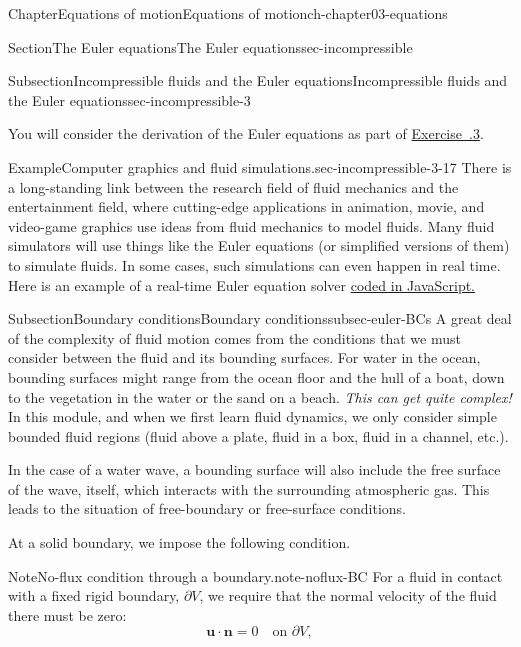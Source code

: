 \documentclass[oneside,10pt,]{book}
\newcommand{\xreffont}{\relax}
\numberwithin{equation}{section}
\newcommand{\bn}{\boldsymbol{n}}
\newcommand{\bu}{\boldsymbol{u}}
\begin{document}
\begin{chapterptx}{Chapter}{Equations of motion}{}{Equations of motion}{}{}{ch-chapter03-equations}
\begin{sectionptx}{Section}{The Euler equations}{}{The Euler equations}{}{}{sec-incompressible}
\begin{subsectionptx}{Subsection}{Incompressible fluids and the Euler equations}{}{Incompressible fluids and the Euler equations}{}{}{sec-incompressible-3}
\par
You will consider the derivation of the Euler equations as part of \hyperlink{ex-hw-euler-check}{Exercise~{\xreffont 3.6.3}}.%
\begin{example}{Example}{Computer graphics and fluid simulations.}{sec-incompressible-3-17}%
There is a long-standing link between the research field of fluid mechanics and the entertainment field, where cutting-edge applications in animation, movie, and video-game graphics use ideas from fluid mechanics to model fluids. Many fluid simulators will use things like the Euler equations (or simplified versions of them) to simulate fluids. In some cases, such simulations can even happen in real time. Here is an example of a real-time Euler equation solver \href{https://matthias-research.github.io/pages/tenMinutePhysics/17-fluidSim.html}{coded in JavaScript.}%
\end{example}
\end{subsectionptx}
%
%
\typeout{************************************************}
\typeout{************************************************}
%
\begin{subsectionptx}{Subsection}{Boundary conditions}{}{Boundary conditions}{}{}{subsec-euler-BCs}
%
A great deal of the complexity of fluid motion comes from the conditions that we must consider between the fluid and its bounding surfaces. For water in the ocean, bounding surfaces might range from the ocean floor and the hull of a boat, down to the vegetation in the water or the sand on a beach. \emph{This can get quite complex!} In this module, and when we first learn fluid dynamics, we only consider simple bounded fluid regions (fluid above a plate, fluid in a box, fluid in a channel, etc.).%
\par
In the case of a water wave, a bounding surface will also include the free surface of the wave, itself, which interacts with the surrounding atmospheric gas. This leads to the situation of free-boundary or free-surface conditions.%
\par
At a solid boundary, we impose the following condition.%
\begin{note}{Note}{No-flux condition through a boundary.}{note-noflux-BC}%
For a fluid in contact with a fixed rigid boundary, \(\partial V\), we require that the normal velocity of the fluid there must be zero:%
\begin{equation}
\bu \cdot \bn = 0 \quad
\textrm{on $\partial V$}, \label{eqn-motion-noflux-BC}

\end{equation}
\end{note}
\end{subsectionptx}
\end{sectionptx}
\end{chapterptx}
\end{document}
